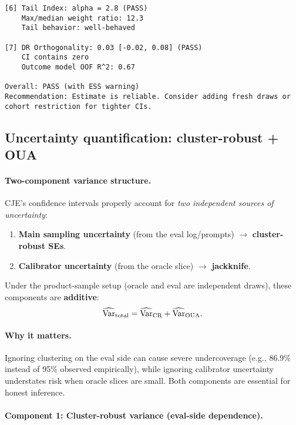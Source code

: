 \begin{enumerate}[resume]
\begin{lstlisting}
[6] Tail Index: alpha = 2.8 (PASS)
    Max/median weight ratio: 12.3
    Tail behavior: well-behaved

[7] DR Orthogonality: 0.03 [-0.02, 0.08] (PASS)
    CI contains zero
    Outcome model OOF R^2: 0.67

Overall: PASS (with ESS warning)
Recommendation: Estimate is reliable. Consider adding fresh draws or cohort restriction for tighter CIs.
\end{lstlisting}

\subsection{Uncertainty quantification: cluster-robust + OUA}

\paragraph{Two-component variance structure.} CJE's confidence intervals properly account for \emph{two independent sources of uncertainty}:
\begin{enumerate}
\item \textbf{Main sampling uncertainty} (from the eval log/prompts) $\to$ \textbf{cluster-robust SEs}.
\item \textbf{Calibrator uncertainty} (from the oracle slice) $\to$ \textbf{\oua{} jackknife}.
\end{enumerate}

Under the product-sample setup (oracle and eval are independent draws), these components are \textbf{additive}:
\begin{equation}
\widehat{\operatorname{Var}}_{\text{total}} = \widehat{\operatorname{Var}}_{\text{CR}} + \widehat{\operatorname{Var}}_{\text{OUA}}.
\end{equation}

\paragraph{Why it matters.} Ignoring clustering on the eval side can cause severe undercoverage (e.g., 86.9\% instead of 95\% observed empirically), while ignoring calibrator uncertainty understates risk when oracle slices are small. Both components are essential for honest inference.

\paragraph{Component 1: Cluster-robust variance (eval-side dependence).}


\end{enumerate}
